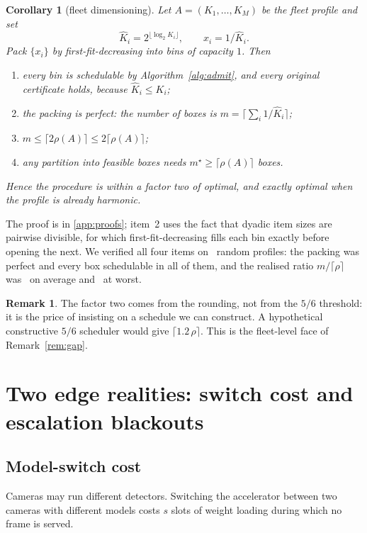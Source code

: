 \documentclass[final,5p,times,twocolumn]{elsarticle}
\newtheorem{corollary}[theorem]{Corollary}
\theoremstyle{definition}
\newtheorem{remark}[theorem]{Remark}
\newcommand{\dens}{\rho}
\begin{document}
\begin{corollary}[fleet dimensioning]\label{cor:dimensioning}
Let $A=(K_1,\dots,K_M)$ be the fleet profile and set
\[
\hat K_i=2^{\lfloor\log_2 K_i\rfloor},\qquad x_i=1/\hat K_i .
\]
Pack $\{x_i\}$ by first-fit-decreasing into bins of capacity $1$. Then
\begin{enumerate}
\item every bin is schedulable by Algorithm~\ref{alg:admit}, and every original certificate holds,
      because $\hat K_i\le K_i$;
\item the packing is perfect: the number of boxes is $m=\big\lceil\sum_i 1/\hat K_i\big\rceil$;
\item $m\le\lceil 2\dens(A)\rceil\le 2\lceil\dens(A)\rceil$;
\item any partition into feasible boxes needs $m^\star\ge\lceil\dens(A)\rceil$ boxes.
\end{enumerate}
Hence the procedure is within a factor two of optimal, and exactly optimal when the profile is
already harmonic.
\end{corollary}

The proof is in \ref{app:proofs}; item~2 uses the fact that dyadic item sizes are pairwise
divisible, for which first-fit-decreasing fills each bin exactly before opening the next. We
verified all four items on \numCfourTrials\ random profiles: the packing was perfect and every box
schedulable in all of them, and the realised ratio $m/\lceil\dens\rceil$ was
\numCfourRatioMean\ on average and \numCfourRatioMax\ at worst.

\begin{remark}
The factor two comes from the rounding, not from the $5/6$ threshold: it is the price of insisting
on a schedule we can construct. A hypothetical constructive $5/6$ scheduler would give
$\lceil 1.2\,\dens\rceil$. This is the fleet-level face of Remark~\ref{rem:gap}.
\end{remark}

\section{Two edge realities: switch cost and escalation blackouts}\label{sec:extensions}

\subsection{Model-switch cost}\label{sec:switch}
Cameras may run different detectors. Switching the accelerator between two cameras with different
models costs $s$ slots of weight loading during which no frame is served.
\end{document}
